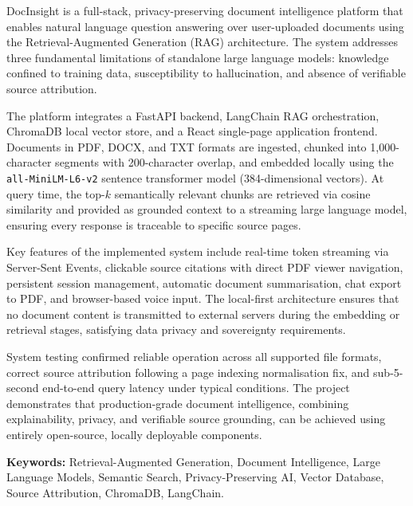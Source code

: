 \documentclass[a4paper,12pt]{report}
\begin{document}
DocInsight is a full-stack, privacy-preserving document intelligence platform that
enables natural language question answering over user-uploaded documents using the
Retrieval-Augmented Generation (RAG) architecture. The system addresses three
fundamental limitations of standalone large language models: knowledge confined to
training data, susceptibility to hallucination, and absence of verifiable source
attribution.

The platform integrates a FastAPI backend, LangChain RAG orchestration, ChromaDB
local vector store, and a React single-page application frontend. Documents in PDF,
DOCX, and TXT formats are ingested, chunked into 1,000-character segments with
200-character overlap, and embedded locally using the \texttt{all-MiniLM-L6-v2}
sentence transformer model (384-dimensional vectors). At query time, the top-$k$
semantically relevant chunks are retrieved via cosine similarity and provided as
grounded context to a streaming large language model, ensuring every response is
traceable to specific source pages.

Key features of the implemented system include real-time token streaming via
Server-Sent Events, clickable source citations with direct PDF viewer navigation,
persistent session management, automatic document summarisation, chat export to PDF,
and browser-based voice input. The local-first architecture ensures that no
document content is transmitted to external servers during the embedding or retrieval
stages, satisfying data privacy and sovereignty requirements.

System testing confirmed reliable operation across all supported file formats, correct
source attribution following a page indexing normalisation fix, and sub-5-second
end-to-end query latency under typical conditions. The project demonstrates that
production-grade document intelligence, combining explainability, privacy, and
verifiable source grounding, can be achieved using entirely open-source, locally
deployable components.

\vspace{0.5cm}
\noindent\textbf{Keywords:} Retrieval-Augmented Generation, Document Intelligence,
Large Language Models, Semantic Search, Privacy-Preserving AI, Vector Database,
Source Attribution, ChromaDB, LangChain.


\end{document}
